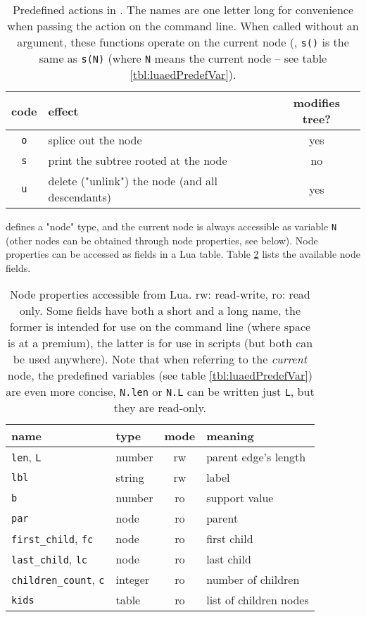 \begin{table}
	\centering
	\begin{tabular}{clc}
		code & effect & modifies tree?\\
		\hline
		\texttt{o}	& splice out the node 									& yes \\
		\texttt{s}	& print the subtree rooted at the node 	& no \\
		\texttt{u} 	& delete ("unlink") the node (and all descendants) & yes
	\end{tabular}
	\caption{%
		\label{tbl:luaedPredefFunc}
		Predefined actions in \luaed. The names are one letter long for convenience
		when passing the action on the command line. When called without an
		argument, these functions operate on the current node (\ie, \texttt{s()} is
		the same as \texttt{s(N)} (where \texttt{N} means the current node -- see
		table \ref{tbl:luaedPredefVar}).
	}
\end{table}

\sched{} defines a "node" type, and the current node is always accessible as
variable \texttt{N} (other nodes can be obtained through node properties, see
below).  Node properties can be accessed as fields in a Lua table. Table \ref{tbl:luaedNodeProp} lists the available node
fields.

\begin{table}
	\center
	\begin{tabular}{llcl}
		name & type & mode & meaning \\
		\hline
		\texttt{len}, \texttt{L} 	& number 	& rw & parent edge's length \\
		\texttt{lbl}							& string 	& rw & label \\
		\texttt{b}								& number	& ro & support value \\
		\texttt{par}							& node		& ro & parent \\
		\texttt{first\_child}, \texttt{fc}  & node & ro & first child \\
		\texttt{last\_child}, \texttt{lc} 	& node & ro & last child \\
		\texttt{children\_count}, \texttt{c} 	& integer & ro & number of children \\
		\texttt{kids}							& table		& ro & list of children nodes
	\end{tabular}
	\caption{%
		\label{tbl:luaedNodeProp}
		Node properties accessible from Lua. rw: read-write, ro: read only. Some
		fields have both a short and a long name, the former is intended for use on
		the command line (where space is at a premium), the latter is for use in
		scripts (but both can be used anywhere). Note that when referring to the
		\emph{current} node, the predefined variables (see table
		\ref{tbl:luaedPredefVar}) are even more concise, \eg{} \texttt{N.len} or
		\texttt{N.L} can be written just \texttt{L}, but they are read-only.
	}
\end{table}

